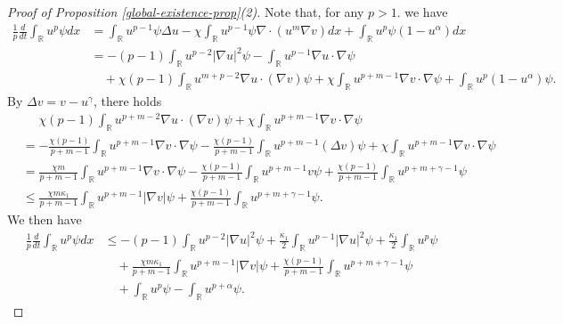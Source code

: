 \documentclass[11pt]{article} %
\theoremstyle{remark}
\theoremstyle{remark}
\numberwithin{equation}{section}
\numberwithin{figure}{section}
\numberwithin{table}{section}
\newcommand\RR{\ensuremath{\mathbb{R}}}
\begin{document}
\begin{proof} [Proof of Proposition \ref{global-existence-prop}(2)]
 Note that, for any  $p>1$.
    we have
    \begin{align*}
\frac{1}{p}\frac{d}{dt}\int_{\RR} u^p \psi dx&=\int_{\RR}u^{p-1}\psi\Delta u-\chi\int_{\RR}u^{p-1}\psi\nabla \cdot(u^m \nabla v)dx+\int_{\RR}u^p \psi(1- u^\alpha )dx\nonumber\\
    &=-(p -1)\int_{\RR} u^{p-2}|\nabla u|^2\psi-\int_{\RR} u^{p -1}\nabla u\cdot\nabla \psi\nonumber\\
    &\quad +\chi (p-1)\int_{\RR} u^{m+p -2} \nabla u\cdot (\nabla v)\psi
    +\chi\int_{\RR}u^{p+m-1} \nabla v\cdot\nabla \psi+\int_{\RR}u^p (1-u^\alpha)\psi.
    \end{align*}
By $\Delta v= v- u^\gamma $, there holds
    \begin{align*}
    &\quad\,\,    \chi(p-1)\int_{\RR}u^{p+m-2}\nabla u\cdot (\nabla v)\psi+\chi\int_{\RR} u^{p+m-1} \nabla v\cdot\nabla \psi\\
    &= -\frac{\chi(p-1)}{p+m-1}\int_{\RR}u^{p+m-1}  \nabla v\cdot\nabla \psi-\frac{\chi(p-1)}{p+m-1}\int_{\RR}u^{p+m-1}  (\Delta v) \psi+\chi\int_{\RR} u^{p+m-1} \nabla v\cdot\nabla \psi\\
    &=\frac{\chi m}{p+m-1}\int_{\RR}
    u^{p+m-1} \nabla v\cdot\nabla \psi-\frac{\chi(p-1)}{p+m-1}\int_{\RR} u^{p+m-1} v\psi+\frac{\chi(p-1)}{p+m-1}\int_{\RR} u^{p+m+\gamma-1}\psi\\
    &\le \frac{\chi m \kappa_1}{p+m-1}\int_{\RR}
    u^{p+m-1} |\nabla v|\psi  +\frac{\chi(p - 1)}{p+m-1}\int_{\RR} u^{p+m+\gamma -1}\psi.
    \end{align*}
We then have
 \begin{align}
\label{prop1-2-eq1}
\frac{1}{p}\frac{d}{dt}\int_{\RR} u^p \psi dx&\le -(p -1)\int_{\RR} u^{p-2}|\nabla u|^2\psi
+\frac{\kappa_1}{2}\int_{\RR} u^{p-1} |\nabla u|^2 \psi +\frac{\kappa_1}{2}\int_{\RR} u^p \psi\nonumber\\
&\quad + \frac{\chi m \kappa_1}{p+m-1}\int_{\RR}
    u^{p+m-1} |\nabla v|\psi  +\frac{\chi(p - 1)}{p+m-1}\int_{\RR} u^{p+m+\gamma-1}\psi\nonumber\\
    &\quad +\int_{\RR}u^p \psi-\int_{\RR} u^{p+\alpha}\psi.
    \end{align}


\end{proof}
\end{document}
